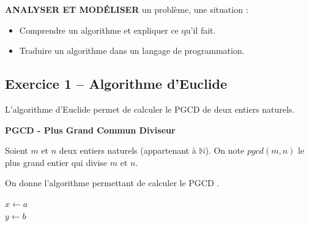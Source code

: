 \documentclass[10pt]{article}
\newif\ifxp
\begin{document}
\ifxp

\else

\fi



 \renewcommand{\baselinestretch}{1.2}
\setlength{\parskip}{2ex plus 0.5ex minus 0.2ex}


\begin{comp}
\textbf{ANALYSER ET MODÉLISER} un problème, une situation :
\begin{itemize}
\item Comprendre un algorithme et expliquer ce qu'il fait.
\item Traduire un algorithme dans un langage de programmation.
\end{itemize}
\end{comp}

\subsection*{Exercice 1 -- Algorithme d'Euclide}
L'algorithme d'Euclide permet de calculer le PGCD de deux entiers naturels. 



\begin{defi}
\textbf{PGCD - Plus Grand Commun Diviseur}

Soient $m$ et $n$ deux entiers naturels (appartenant à $\mathbb{N}$). On note $pgcd(m,n)$ le plus grand entier qui divise $m$ et $n$.
\end{defi}

On donne l'algorithme permettant de calculer le PGCD .

\begin{pseudo}
\begin{algorithm}[H]
$x\gets a$\\
$y\gets b$\\


\end{algorithm}
\end{pseudo}
\end{document}
